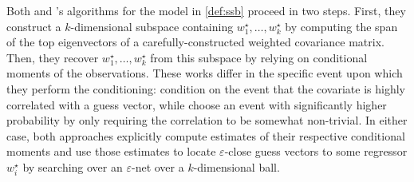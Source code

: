 \documentclass[11pt,letterpaper]{article}
\theoremstyle{plain}
\theoremstyle{definition}
\theoremstyle{remark}
\newcommand{\eps}{\varepsilon}
\begin{document}
            {Both \cite{cherapanamjeri2023selfselection} and \cite{gaitonde2024selfselection}'s algorithms for the model in \cref{def:ssb}
    {proceed in two steps. First, they construct a $k$-dimensional subspace containing $w_1^\star,\dots,w_k^\star$ by computing the span of the top eigenvectors of a carefully-constructed weighted covariance matrix. Then, they recover $w_1^\star,\dots,w_k^\star$ from this subspace by} relying} on conditional moments of the observations.
            These works differ in the specific event upon which they perform the conditioning:
            \cite{cherapanamjeri2023selfselection} condition on the event that the covariate is highly correlated with a guess vector,
            while \cite{gaitonde2024selfselection} choose an event with significantly higher probability
            by only requiring the correlation to be somewhat non-trivial.
            In either case, both approaches explicitly compute estimates of their respective conditional moments and use those estimates to locate $\eps$-close guess vectors to some regressor $w^\star_i$
            {by searching over an $\eps$-net over a $k$-dimensional ball}.
\end{document}
